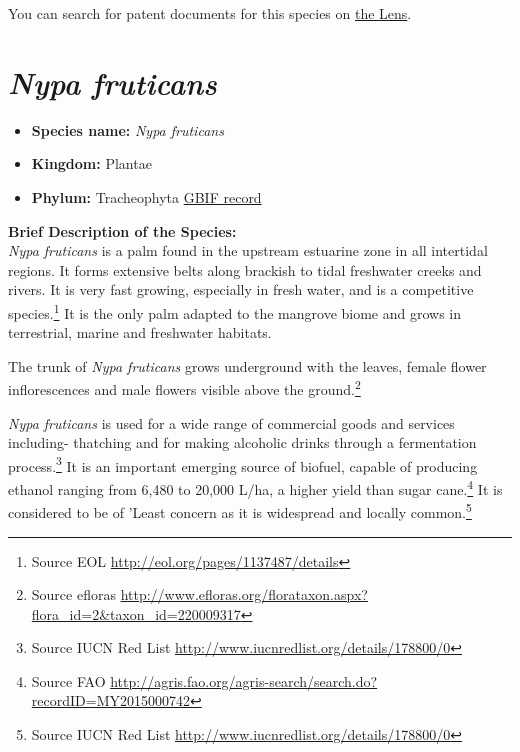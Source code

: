 \documentclass[]{book}
\providecommand{\tightlist}{%
  \setlength{\itemsep}{0pt}\setlength{\parskip}{0pt}}
\let\rmarkdownfootnote\footnote%
\def\footnote{\protect\rmarkdownfootnote}
\theoremstyle{definition}
\theoremstyle{definition}
\theoremstyle{definition}
\theoremstyle{remark}
\begin{document}
You can search for patent documents for this species on
\href{https://www.lens.org/lens/search?q=full_text:(\%22Macrobachium\%20rosenbergii\%22)\%20OR\%20full_text:(\%22Giant\%20River\%20Prawn\%22)\%20OR\%20full_text:(\%22Giant\%20Freshwater\%20Prawn\%22)\&l=en\&types=Patent\%20Application,Granted\%20Patent\&types=Patent\%20Application\&types=Granted\%20Patent\&preview=true}{the
Lens}.

\hypertarget{nypa-fruticans}{%
\section{\texorpdfstring{\emph{Nypa
fruticans}}{Nypa fruticans}}\label{nypa-fruticans}}

\begin{itemize}
\tightlist
\item
  \textbf{Species name:} \emph{Nypa fruticans}
\item
  \textbf{Kingdom:} Plantae
\item
  \textbf{Phylum:} Tracheophyta
  \href{https://www.gbif.org/species/2738422}{GBIF record}
\end{itemize}

\textbf{Brief Description of the Species:}\\
\emph{Nypa fruticans} is a palm found in the upstream estuarine zone in
all intertidal regions. It forms extensive belts along brackish to tidal
freshwater creeks and rivers. It is very fast growing, especially in
fresh water, and is a competitive species.\footnote{Source EOL
  \url{http://eol.org/pages/1137487/details}} It is the only palm
adapted to the mangrove biome and grows in terrestrial, marine and
freshwater habitats.

The trunk of \emph{Nypa fruticans} grows underground with the leaves,
female flower inflorescences and male flowers visible above the
ground.\footnote{Source efloras
  \url{http://www.efloras.org/florataxon.aspx?flora_id=2\&taxon_id=220009317}}

\emph{Nypa fruticans} is used for a wide range of commercial goods and
services including- thatching and for making alcoholic drinks through a
fermentation process.\footnote{Source IUCN Red List
  \url{http://www.iucnredlist.org/details/178800/0}} It is an important
emerging source of biofuel, capable of producing ethanol ranging from
6,480 to 20,000 L/ha, a higher yield than sugar cane.\footnote{Source
  FAO
  \url{http://agris.fao.org/agris-search/search.do?recordID=MY2015000742}}
It is considered to be of 'Least concern as it is widespread and locally
common.\footnote{Source IUCN Red List
  \url{http://www.iucnredlist.org/details/178800/0}}
\end{document}
